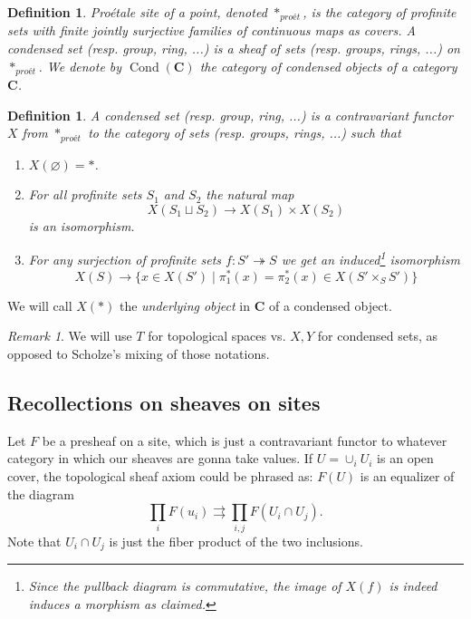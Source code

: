 \documentclass[12pt]{article}
\theoremstyle{darkgreentheorem}
\theoremstyle{darkbluedefinition}
\newtheorem{defn}[thm]{Definition}
\theoremstyle{darkredexample}
\theoremstyle{remark}
\newtheorem{rem}[thm]{Remark}
\newcommand{\1}{\mathbbm{1}}
\newcommand{\bfC}{\mathbf{C}}
\DeclareMathOperator{\Cond}{Cond}
\newcommand{\pe}{*_{proét}}
\newcommand{\fp}[1]{\times_{#1}}
\begin{document}
\begin{defn}
    Pro\'{e}tale site of a point, denoted $\pe$, is the category of profinite sets with finite jointly surjective families of continuous maps as covers.
    A \textit{condensed set} (resp. group, ring, ...) is a sheaf of sets (resp. groups, rings, ...) on $\pe$.
    We denote by $\Cond(\bfC)$ the category of condensed objects of a category $\bfC$.
\end{defn}

\begin{defn}
    A \textit{condensed set} (resp. group, ring, ...) is a contravariant functor $X$ from $\pe$ to the category of sets (resp. groups, rings, ...) such that 
    \begin{enumerate}[label=\roman*)]
	\item $X(\varnothing)=*$.
	\item For all profinite sets $S_{1}$ and $S_{2}$ the natural map
	    \[ X(S_{1}\sqcup S_{2})\to X(S_{1})\times X(S_{2}) \]
	    is an isomorphism.
	\item For any surjection of profinite sets $f\colon S'\twoheadrightarrow S$ we get an induced\footnote{Since the pullback diagram is commutative, the image of $X(f)$ is indeed induces a morphism as claimed.} isomorphism
	    \[ X(S)\to \{ x\in X(S')\mid \pi_{1}^{*}(x)=\pi_{2}^{*}(x)\in X(S'\fp{S}S')\} \]
    \end{enumerate}
\end{defn}

We will call $X(*)$ the \textit{underlying object} in $\bfC$ of a condensed object.

\begin{rem}
    We will use $T$ for topological spaces vs. $X,Y$ for condensed sets, as opposed to Scholze's mixing of those notations.
\end{rem}

\subsection{Recollections on sheaves on sites}

Let $F$ be a presheaf on a site, which is just a contravariant functor to whatever category in which our sheaves are gonna take values.
If $U=\cup_{i}U_{i}$ is an open cover, the topological sheaf axiom could be phrased as: $F(U)$ is an equalizer of the diagram
\[ \prod_{i}F(u_{i})\rightrightarrows \prod_{i,j}F(U_{i}\cap U_{j}). \]
Note that $U_{i}\cap U_{j}$ is just the fiber product of the two inclusions.
\end{document}
